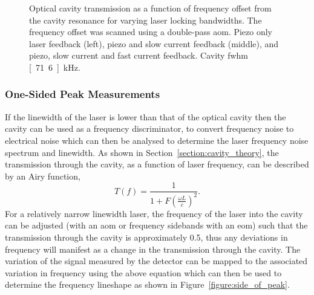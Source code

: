 \begin{figure}
\center

\caption[Optical cavity transmission demonstrating laser frequency lock bandwidths.]{Optical cavity transmission as a function of frequency offset from the cavity resonance for varying laser locking bandwidths. The frequency offset was scanned using a double-pass \gls{aom}. Piezo only laser feedback (left), piezo and slow current feedback (middle), and piezo, slow current and fast current feedback. Cavity \gls{fwhm} \unit[71.6]{kHz}.}
\label{figure:cavity_scans}
\end{figure}

\subsubsection{One-Sided Peak Measurements}\label{section:one_sided_peak}

If the linewidth of the laser is lower than that of the optical cavity then the cavity can be used as a frequency discriminator, to convert frequency noise to electrical noise which can then be analysed to determine the laser frequency noise spectrum and linewidth.
As shown in Section~\ref{section:cavity_theory}, the transmission through the cavity, as a function of laser frequency, can be described by an Airy function,
\begin{equation}
T(f) = \frac{1}{1+F\left(\frac{\omega L}{c}\right)^2}.
\end{equation}
For a relatively narrow linewidth laser, the frequency of the laser into the cavity can be adjusted (with an \gls{aom} or frequency sidebands with an \gls{eom}) such that the transmission through the cavity is approximately 0.5, thus any deviations in frequency will manifest as a change in the transmission through the cavity.
The variation of the signal measured by the detector can be mapped to the associated variation in frequency using the above equation which can then be used to determine the frequency lineshape as shown in Figure~\ref{figure:side_of_peak}.


